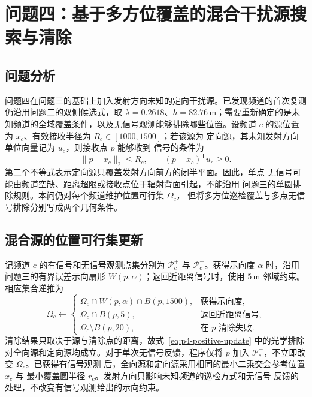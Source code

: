 \section{问题四：基于多方位覆盖的混合干扰源搜索与清除}

\subsection{问题分析}

问题四在问题三的基础上加入发射方向未知的定向干扰源。已发现频道的首次复测仍沿用问题二的双侧候选式，取 $\lambda=0.2618$、$h=82.76\,\mathrm m$；需要重新确定的是未知频道的全域覆盖条件，以及无信号观测能够排除哪些位置。设频道 $c$
的源位置为 $x_c$、有效接收半径为 $R_c\in[1000,1500]$；若该源为
定向源，其未知发射方向单位向量记为 $u_c$，则接收点 $p$ 能够收到
信号的条件为
\begin{equation}
  \|p-x_c\|_2\le R_c,\qquad
  (p-x_c)^{\mathsf T}u_c\ge0.
  \label{eq:p4-visibility}
\end{equation}
第二个不等式表示定向源只覆盖发射方向前方的闭半平面。因此，单点
无信号可能由频道空缺、距离超限或接收点位于辐射背面引起，不能沿用
问题三的单圆排除规则。本问仍对每个频道维护位置可行集 $\Omega_c$，
但将多方位巡检覆盖与多点无信号排除分别写成两个几何条件。


\subsection{混合源的位置可行集更新}

记频道 $c$ 的有信号和无信号观测点集分别为
$\mathcal P_c^+$ 与 $\mathcal P_c^-$。获得示向度 $\alpha$ 时，沿用
问题三的有界误差示向扇形 $W(p,\alpha)$；返回近距离信号时，使用
$5\,\mathrm m$ 邻域约束。相应集合递推为
\begin{equation}
  \Omega_c\leftarrow
  \begin{cases}
    \Omega_c\cap W(p,\alpha)\cap B(p,1500),
      & \text{获得示向度},\\
    \Omega_c\cap B(p,5),
      & \text{返回近距离信号},\\
    \Omega_c\setminus B(p,20),
      & \text{在 $p$ 清除失败}.
  \end{cases}
  \label{eq:p4-positive-update}
\end{equation}
清除结果只取决于源与清除点的距离，故式~\eqref{eq:p4-positive-update}
中的光学排除对全向源和定向源均成立。对于单次无信号反馈，程序仅将
$p$ 加入 $\mathcal P_c^-$，不立即改变 $\Omega_c$。已获得有信号观测
后，全向源和定向源采用相同的最小二乘交会参考位置 $\hat x_c$ 与
最小覆盖圆半径 $r_c$。发射方向只影响未知频道的巡检方式和无信号
反馈的处理，不改变有信号观测给出的示向约束。

